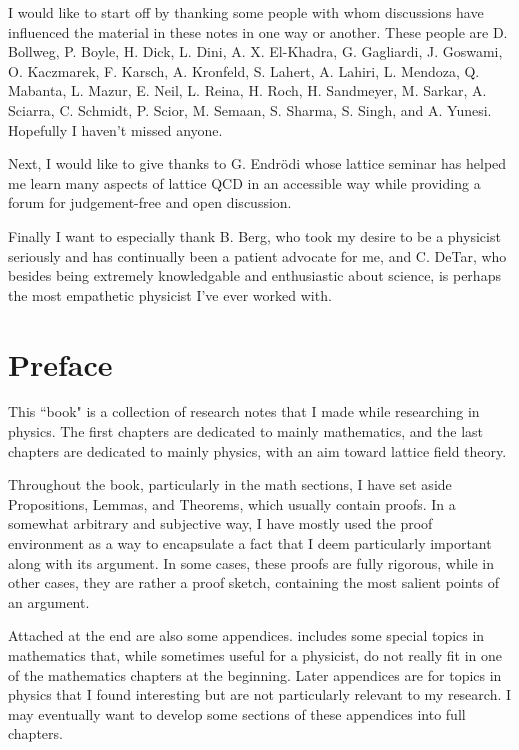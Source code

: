 \documentclass[12pt]{book}
\theoremstyle{definition}
\begin{document}
I would like to start off by thanking some people with whom discussions
have influenced the material in these notes in one way or another.
These people are
D. Bollweg,
P. Boyle,
H. Dick,
L. Dini,
A. X. El-Khadra,
G. Gagliardi,
J. Goswami,
O. Kaczmarek,
F. Karsch,
A. Kronfeld,
S. Lahert,
A. Lahiri,
L. Mendoza,
Q. Mabanta,
L. Mazur,
E. Neil,
L. Reina,
H. Roch,
H. Sandmeyer,
M. Sarkar,
A. Sciarra,
C. Schmidt,
P. Scior,
M. Semaan,
S. Sharma,
S. Singh,
and
A. Yunesi.
Hopefully I haven't missed anyone.

Next, I would like to give thanks to G. Endr\"odi whose lattice seminar
has helped me learn many aspects of lattice QCD in an accessible way while
providing a forum for judgement-free and open discussion.

Finally I want to especially thank B. Berg, who took my desire to be a
physicist seriously and has continually been a patient advocate for me,
and C. DeTar, who besides being extremely knowledgable and enthusiastic about
science, is perhaps the most empathetic physicist I've ever worked with.


\chapter{Preface}
This ``book" is a collection of research notes that I made while researching in
physics. The first chapters are dedicated to mainly mathematics, and the last
chapters are dedicated to mainly physics, with an aim toward lattice field
theory. 

Throughout the book, particularly in the math sections, I have set aside
Propositions, Lemmas, and Theorems, which usually contain proofs. 
In a somewhat arbitrary and
subjective way, I have mostly used the proof environment as a way to encapsulate
a fact that I deem particularly important along with its argument.
In some cases, these proofs are fully rigorous, while in other cases, they are 
rather a proof sketch,
containing the most salient points of an argument. 

Attached at the end are also some appendices. 
 includes some special topics in mathematics 
that, while sometimes useful for a physicist, do not really fit in one of 
the mathematics chapters at the beginning.
Later appendices are for topics in physics that I found interesting but are
not particularly relevant to my research.
I may eventually want
to develop some sections of these appendices into full chapters.


\tableofcontents                        %
\mainmatter                             %
\end{document}
